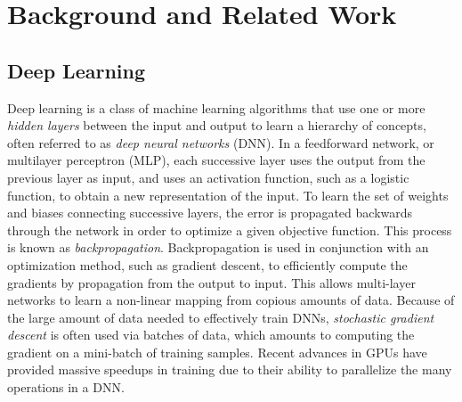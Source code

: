\documentclass[9pt]{article}
\begin{document}
\section{Background and Related Work}

\subsection{Deep Learning}
Deep learning is a class of machine learning algorithms that use one or more \textit{hidden layers} between the input and output
to learn a hierarchy of concepts, often referred to as \textit{deep neural networks} (DNN).
In a feedforward network, or multilayer perceptron (MLP), each successive layer uses the output
from the previous layer as input, and uses an activation function, such as a logistic function, to obtain a new representation of the input. To
learn the set of weights and biases connecting successive layers, the error is propagated backwards through the network in order to optimize a
given objective function. This process is known as \textit{backpropagation}. Backpropagation is used in conjunction with an optimization method,
such as gradient descent, to efficiently compute the gradients by propagation from the output to input. This allows multi-layer networks to learn
a non-linear mapping from copious amounts of data. Because of the large amount of data needed to effectively train DNNs, \textit{stochastic gradient descent}
is often used via batches of data, which amounts to computing the gradient on a mini-batch of training samples. Recent advances in GPUs have
provided massive speedups in training due to their ability to parallelize the many operations in a DNN. \newline

\end{document}
